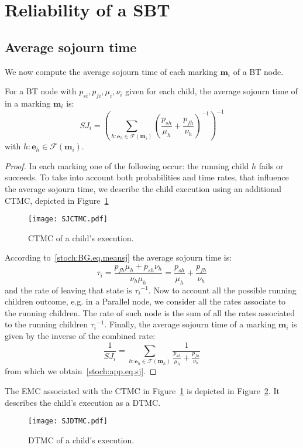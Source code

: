 \section{Reliability of a SBT}
\label{stoch:sec:reli}
\subsection{Average sojourn time}
We now compute the average sojourn time of each marking $\mathbf{m}_i$ of a BT node. 
\begin{lemma}
For a BT node with $p_{si},p_{fi}, \mu_i,\nu_i$ given for each child, the average sojourn time of in a marking $\mathbf{m}_i$ is:
\begin{equation}
SJ_i =\left(   \displaystyle\sum_{h:\mathbf{e}_h\in \mathcal{F}(\mathbf{m}_i)} \left(\frac{p_{sh}}{\mu_h}+\frac{p_{fh}}{\nu_h}\right)^{-1}     \right)^{-1}
\label{stoch:app.eq.sj}
\end{equation}  
with $h: \mathbf{e}_h \in \mathcal{F}(\mathbf{m}_i)$.

\end{lemma}
\begin{proof}

In each marking one of the following occur: the running child $h$ fails or succeeds. To take into account both probabilities and time rates, that influence the average sojourn time, we describe the child execution using an additional CTMC, depicted in Figure~\ref{stoch:app.fig.sjmc}

\begin{figure}[h]
\centering
\texttt{[image: SJCTMC.pdf]}
\caption{CTMC of a child's execution.}
\label{stoch:app.fig.sjmc}
\end{figure}
According to~\eqref{stoch:BG.eq.meansj} the average sojourn time is: 
\begin{equation}
\tau_i=\frac{p_{fh} \mu_h + p_{sh}\nu_h } {\nu_h\mu_h } = \frac{p_{sh}}{\mu_h}+\frac{p_{fh}}{\nu_h}
\end{equation}
and the rate of leaving that state is ${\tau_i}^{-1}$.
Now to account all the possible running children outcome, e.g. in a Parallel node, we consider all the rates associate to the running children. The rate of such node is the sum of all the rates associated to the running children ${\tau_i}^{-1}$. Finally, the average sojourn time of a marking $\mathbf{m}_i$ is given by the inverse of the combined rate:
\begin{equation}
\frac{1}{ SJ_i }= \displaystyle \sum_{h:\mathbf{e}_h\in \mathcal{F}(\mathbf{m}_h)} \frac{1}{\frac{p_{sh}}{\mu_h}+\frac{p_{fh}}{\nu_h}}
\end{equation}
from which we obtain~\eqref{stoch:app.eq.sj}.
\end{proof}
\begin{remark}
The EMC associated with the CTMC in Figure~\ref{stoch:app.fig.sjmc} is depicted in Figure~\ref{stoch:app.fig.dsjmc}. It describes the child's execution as a DTMC.
\end{remark}
\begin{figure}[h]
\centering
\texttt{[image: SJDTMC.pdf]}
\caption{DTMC of a child's execution.}
\label{stoch:app.fig.dsjmc}
\end{figure}

